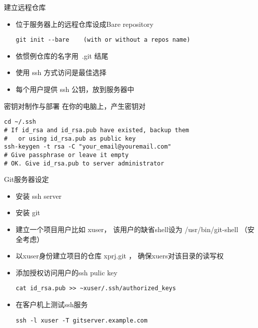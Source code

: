 \begin{frame}[<+->][fragile]{建立远程仓库}
    \begin{itemize}
        \item 位于服务器上的远程仓库设成Bare repository
        \begin{Verbatim}[frame=single,commandchars=\\\{\}]
git init --bare    (with or without a repos name)
        \end{Verbatim}
        \item 依惯例仓库的名字用\ .git 结尾
        \item 使用 ssh 方式访问是最佳选择
        \item 每个用户提供 ssh 公钥，放到服务器中
    \end{itemize}
\end{frame}

\begin{frame}[<+->][fragile]{密钥对制作与部署}
在你的电脑上，产生密钥对

        \begin{Verbatim}[frame=single,commandchars=\\\{\}]
cd ~/.ssh
# If id_rsa and id_rsa.pub have existed, backup them
#   or using id_rsa.pub as public key
ssh-keygen -t rsa -C "your_email@youremail.com"
# Give passphrase or leave it empty
# OK. Give id_rsa.pub to server administrator
        \end{Verbatim}
\end{frame}

\begin{frame}[<+->][fragile]{Git服务器设定}
    \begin{itemize}
        \item 安装 ssh server
        \item 安装 git
        \item 建立一个项目用户比如 xuser，
        该用户的缺省shell设为 /usr/bin/git-shell （安全考虑）
        \item 以xuser身份建立项目的仓库 xprj.git ， 确保xuers对该目录的读写权
        \item 添加授权访问用户的ssh pulic key
        \begin{Verbatim}[frame=single,commandchars=\\\{\}]
cat id_rsa.pub >> ~xuser/.ssh/authorized_keys
        \end{Verbatim}
        \item 在客户机上测试ssh服务
        \begin{Verbatim}[frame=single,commandchars=\\\{\}]
ssh -l xuser -T gitserver.example.com        
        \end{Verbatim}
    \end{itemize}
\end{frame}

